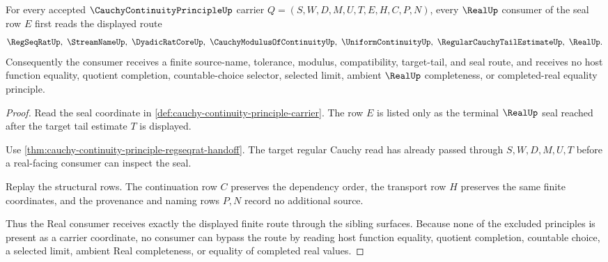 \begin{theorem}
\label{thm:cauchy-continuity-principle-real-seal-boundary}
For every accepted $\CauchyContinuityPrincipleUp$ carrier $Q=(S,W,D,M,U,T,E,H,C,P,N)$, every $\RealUp$ consumer of the seal row $E$ first reads the displayed route
$$
\RegSeqRatUp,\ \StreamNameUp,\ \DyadicRatCoreUp,\ \CauchyModulusOfContinuityUp,\ \UniformContinuityUp,\ \RegularCauchyTailEstimateUp,\ \RealUp .
$$
Consequently the consumer receives a finite source-name, tolerance, modulus, compatibility, target-tail, and seal route, and receives no host function equality, quotient completion, countable-choice selector, selected limit, ambient $\RealUp$ completeness, or completed-real equality principle.
\end{theorem}
\begin{proof}
Read the seal coordinate in \autoref{def:cauchy-continuity-principle-carrier}. The row $E$ is listed only as the terminal $\RealUp$ seal reached after the target tail estimate $T$ is displayed.

Use \autoref{thm:cauchy-continuity-principle-regseqrat-handoff}. The target regular Cauchy read has already passed through $S,W,D,M,U,T$ before a real-facing consumer can inspect the seal.

Replay the structural rows. The continuation row $C$ preserves the dependency order, the transport row $H$ preserves the same finite coordinates, and the provenance and naming rows $P,N$ record no additional source.

Thus the Real consumer receives exactly the displayed finite route through the sibling surfaces. Because none of the excluded principles is present as a carrier coordinate, no consumer can bypass the route by reading host function equality, quotient completion, countable choice, a selected limit, ambient Real completeness, or equality of completed real values.
\end{proof}


